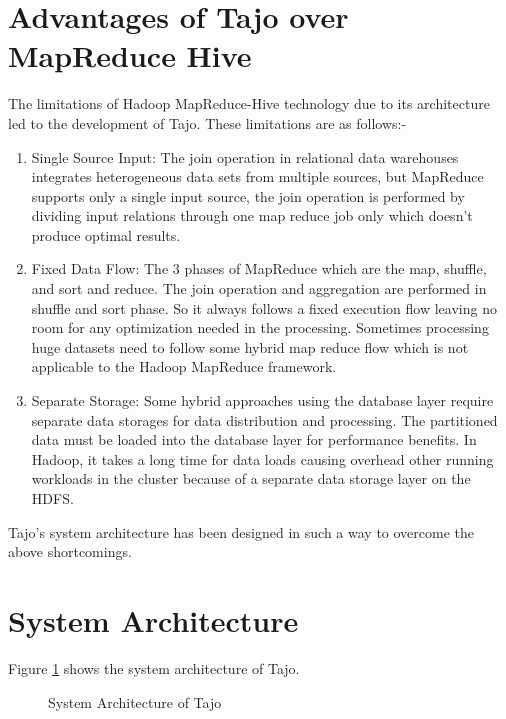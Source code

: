 \documentclass[9pt,twocolumn,twoside]{../../styles/osajnl}
\begin{document}
\section{Advantages of Tajo over MapReduce Hive}
The limitations \cite{tajo-paper} of Hadoop MapReduce-Hive
\cite{hive-paper} technology due to its architecture led to the
development of Tajo. These limitations are as
follows:- \begin{enumerate} \item Single Source Input: The join
  operation in relational data warehouses integrates heterogeneous
  data sets from multiple sources, but MapReduce supports only a
  single input source, the join operation is performed by dividing
  input relations through one map reduce job only which doesn't
  produce optimal results. \item Fixed Data Flow: The 3 phases of
  MapReduce which are the map, shuffle, and sort and reduce. The join
  operation and aggregation are performed in shuffle and sort
  phase. So it always follows a fixed execution flow leaving no room
  for any optimization needed in the processing. Sometimes processing
  huge datasets need to follow some hybrid map reduce flow which is
  not applicable to the Hadoop MapReduce framework. \item Separate
  Storage: Some hybrid approaches using the database layer require
  separate data storages for data distribution and processing. The
  partitioned data must be loaded into the database layer for
  performance benefits. In Hadoop, it takes a long time for data loads
  causing overhead other running workloads in the cluster because of a
  separate data storage layer on the HDFS.\end{enumerate}

\noindent
Tajo's system architecture has been designed in such a way to overcome
the above shortcomings.


\section{System Architecture}

Figure \ref{fig:architecture} shows the system architecture of Tajo.

\begin{figure}[htbp]
\centering
{}
\caption{\cite{tajo-paper} System Architecture of Tajo}
\label{fig:architecture}
\end{figure}
\end{document}

